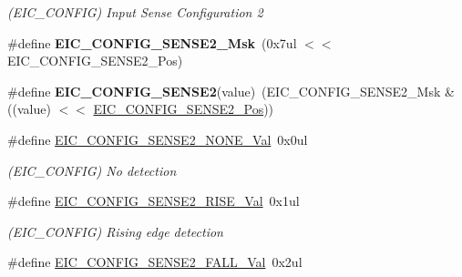\begin{DoxyCompactItemize}
\begin{DoxyCompactList}\small\item\em (E\+I\+C\+\_\+\+C\+O\+N\+F\+I\+G) Input Sense Configuration 2 \end{DoxyCompactList}\item 
\hypertarget{group___s_a_m_l21___e_i_c_gafba4355db43ca8318bc2ce2f6c8ae464}{}\#define {\bfseries E\+I\+C\+\_\+\+C\+O\+N\+F\+I\+G\+\_\+\+S\+E\+N\+S\+E2\+\_\+\+Msk}~(0x7ul $<$$<$ E\+I\+C\+\_\+\+C\+O\+N\+F\+I\+G\+\_\+\+S\+E\+N\+S\+E2\+\_\+\+Pos)\label{group___s_a_m_l21___e_i_c_gafba4355db43ca8318bc2ce2f6c8ae464}

\item 
\hypertarget{group___s_a_m_l21___e_i_c_gac962ab50d64cad7bdffe1589d05ea8fe}{}\#define {\bfseries E\+I\+C\+\_\+\+C\+O\+N\+F\+I\+G\+\_\+\+S\+E\+N\+S\+E2}(value)~(E\+I\+C\+\_\+\+C\+O\+N\+F\+I\+G\+\_\+\+S\+E\+N\+S\+E2\+\_\+\+Msk \& ((value) $<$$<$ \hyperlink{group___s_a_m_l21___e_i_c_gaf67e9a2938eae7c6f9f4d19c405e243f}{E\+I\+C\+\_\+\+C\+O\+N\+F\+I\+G\+\_\+\+S\+E\+N\+S\+E2\+\_\+\+Pos}))\label{group___s_a_m_l21___e_i_c_gac962ab50d64cad7bdffe1589d05ea8fe}

\item 
\hypertarget{group___s_a_m_l21___e_i_c_ga89231a2e48fe64b47ec85f545280b7df}{}\#define \hyperlink{group___s_a_m_l21___e_i_c_ga89231a2e48fe64b47ec85f545280b7df}{E\+I\+C\+\_\+\+C\+O\+N\+F\+I\+G\+\_\+\+S\+E\+N\+S\+E2\+\_\+\+N\+O\+N\+E\+\_\+\+Val}~0x0ul\label{group___s_a_m_l21___e_i_c_ga89231a2e48fe64b47ec85f545280b7df}

\begin{DoxyCompactList}\small\item\em (E\+I\+C\+\_\+\+C\+O\+N\+F\+I\+G) No detection \end{DoxyCompactList}\item 
\hypertarget{group___s_a_m_l21___e_i_c_ga4c6f24459946c4c716e15f887cf91732}{}\#define \hyperlink{group___s_a_m_l21___e_i_c_ga4c6f24459946c4c716e15f887cf91732}{E\+I\+C\+\_\+\+C\+O\+N\+F\+I\+G\+\_\+\+S\+E\+N\+S\+E2\+\_\+\+R\+I\+S\+E\+\_\+\+Val}~0x1ul\label{group___s_a_m_l21___e_i_c_ga4c6f24459946c4c716e15f887cf91732}

\begin{DoxyCompactList}\small\item\em (E\+I\+C\+\_\+\+C\+O\+N\+F\+I\+G) Rising edge detection \end{DoxyCompactList}\item 
\hypertarget{group___s_a_m_l21___e_i_c_ga2f603343d04d42dfa3c238016be954b5}{}\#define \hyperlink{group___s_a_m_l21___e_i_c_ga2f603343d04d42dfa3c238016be954b5}{E\+I\+C\+\_\+\+C\+O\+N\+F\+I\+G\+\_\+\+S\+E\+N\+S\+E2\+\_\+\+F\+A\+L\+L\+\_\+\+Val}~0x2ul\label{group___s_a_m_l21___e_i_c_ga2f603343d04d42dfa3c238016be954b5}


\end{DoxyCompactItemize}
